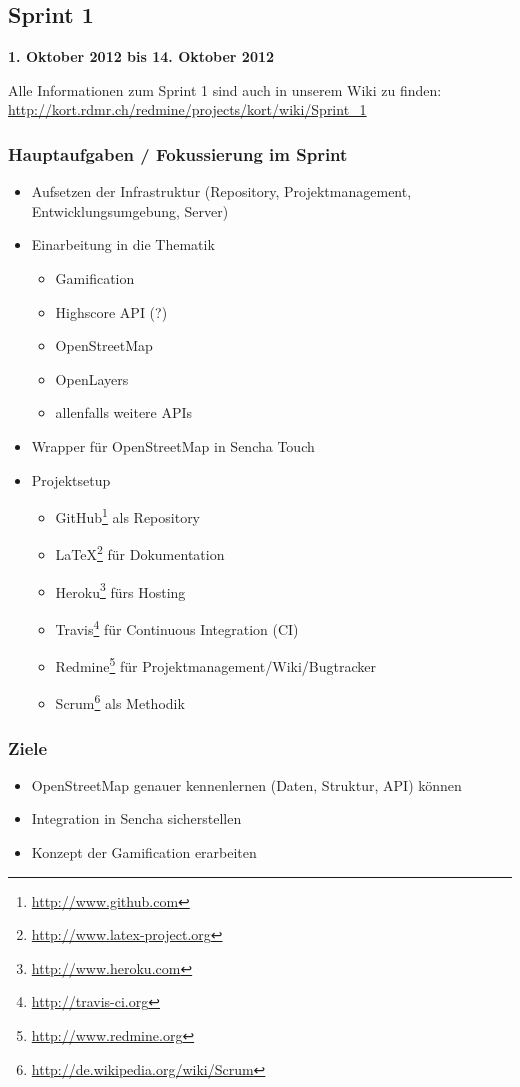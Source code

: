 \subsection{Sprint 1}

\textbf{1. Oktober 2012 bis 14. Oktober 2012}

Alle Informationen zum Sprint 1 sind auch in unserem Wiki zu finden:
\url{http://kort.rdmr.ch/redmine/projects/kort/wiki/Sprint_1}

\subsubsection{Hauptaufgaben / Fokussierung im Sprint}

\begin{itemize}
	\item Aufsetzen der Infrastruktur (Repository, Projektmanagement, Entwicklungsumgebung, Server)
	\item Einarbeitung in die Thematik
	\begin{itemize}
		\item Gamification
		\item Highscore API (?)
		\item \gls{OpenStreetMap}
		\item OpenLayers
		\item allenfalls weitere \gls{API}s
	\end{itemize}
	\item Wrapper für \gls{OpenStreetMap} in Sencha Touch
	\item Projektsetup
	\begin{itemize}
		\item GitHub\footnote{\url{http://www.github.com}} als Repository
		\item \LaTeX{}\footnote{\url{http://www.latex-project.org}} für Dokumentation
		\item Heroku\footnote{\url{http://www.heroku.com}} fürs Hosting
		\item Travis\footnote{\url{http://travis-ci.org}} für Continuous Integration (CI)
		\item Redmine\footnote{\url{http://www.redmine.org}} für Projektmanagement/Wiki/Bugtracker
		\item Scrum\footnote{\url{http://de.wikipedia.org/wiki/Scrum}} als Methodik
	\end{itemize}
\end{itemize}

\subsubsection{Ziele}
\begin{itemize}
	\item \gls{OpenStreetMap} genauer kennenlernen (Daten, Struktur, \gls{API}) können
	\item Integration in Sencha sicherstellen
	\item Konzept der \gls{Gamification} erarbeiten
\end{itemize}

